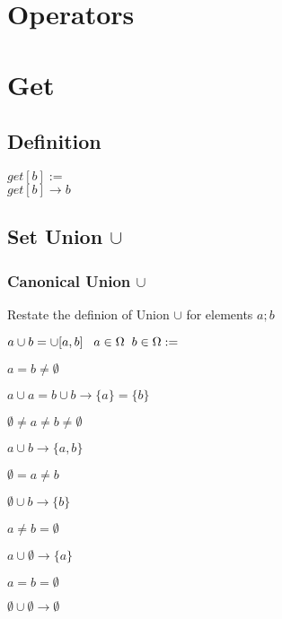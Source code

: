 \documentclass[11pt]{article}
\begin{document}
\section*{Operators}

\section{Get}
\subsection{Definition}
\begin{center}
$
get[b] :=
$
\\ \vspace{2mm}
$
get[b] \rightarrow b
$
\end{center}






\subsection{Set Union $\cup$}




\subsubsection{Canonical Union $\cup$}
Restate the definion of Union $\cup$ for elements $a;b$
\vspace{2mm}
\begin{center}
$
a  \cup  b = \cup[a,b] \hspace{3mm} a \in \Omega \hspace{2mm} b \in \Omega := 
$
\end{center}
$a = b \neq \emptyset$
\begin{center}
$
a  \cup  a = b \cup b \rightarrow \{a\} = \{b\}
$
\end{center}
\vspace{2mm}
$\emptyset \neq a \neq b \neq \emptyset$
\begin{center}
$
a \cup  b \rightarrow \{a,b\}
$
\end{center}
\vspace{2mm}
$\emptyset = a \neq b$
\begin{center}
$
\emptyset \cup  b \rightarrow \{b\}
$
\end{center}
\vspace{2mm}
$a \neq b = \emptyset$
\begin{center}
$
a \cup \emptyset \rightarrow \{a\}
$
\end{center}
\vspace{2mm}
$a = b = \emptyset$
\begin{center}
$
\emptyset \cup \emptyset \rightarrow \emptyset
$
\end{center}
\end{document}
